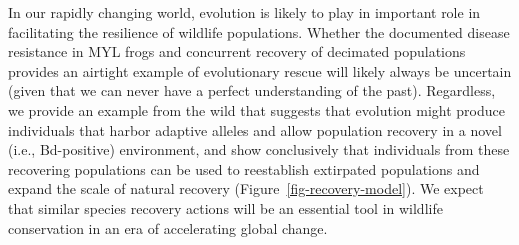 \documentclass[9pt,twocolumn,twoside,lineno]{pnas-new}
\begin{document}
In our rapidly changing world, evolution is likely to play in important
role in facilitating the resilience of wildlife populations. Whether the
documented disease resistance in MYL frogs and concurrent recovery of
decimated populations provides an airtight example of evolutionary
rescue will likely always be uncertain (given that we can never have a
perfect understanding of the past). Regardless, we provide an example
from the wild that suggests that evolution might produce individuals
that harbor adaptive alleles and allow population recovery in a novel
(i.e., Bd-positive) environment, and show conclusively that individuals
from these recovering populations can be used to reestablish extirpated
populations and expand the scale of natural recovery
(Figure~\ref{fig-recovery-model}). We expect that similar species
recovery actions will be an essential tool in wildlife conservation in
an era of accelerating global change.
\end{document}
